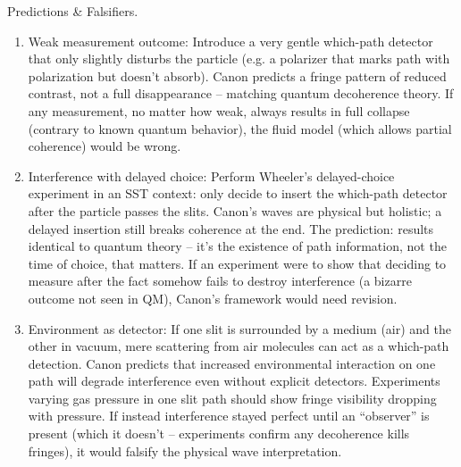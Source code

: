\documentclass[11pt]{article}
\begin{document}
Predictions & Falsifiers.


\begin{enumerate}

\item 
Weak measurement outcome: Introduce a very gentle which-path detector that only slightly disturbs the particle (e.g. a polarizer that marks path with polarization but doesn’t absorb). Canon predicts a fringe pattern of reduced contrast, not a full disappearance – matching quantum decoherence theory. If any measurement, no matter how weak, always results in full collapse (contrary to known quantum behavior), the fluid model (which allows partial coherence) would be wrong.




\item 
Interference with delayed choice: Perform Wheeler’s delayed-choice experiment in an SST context: only decide to insert the which-path detector after the particle passes the slits. Canon’s waves are physical but holistic; a delayed insertion still breaks coherence at the end. The prediction: results identical to quantum theory – it’s the existence of path information, not the time of choice, that matters. If an experiment were to show that deciding to measure after the fact somehow fails to destroy interference (a bizarre outcome not seen in QM), Canon’s framework would need revision.




\item 
Environment as detector: If one slit is surrounded by a medium (air) and the other in vacuum, mere scattering from air molecules can act as a which-path detection. Canon predicts that increased environmental interaction on one path will degrade interference even without explicit detectors. Experiments varying gas pressure in one slit path should show fringe visibility dropping with pressure. If instead interference stayed perfect until an “observer” is present (which it doesn’t – experiments confirm any decoherence kills fringes), it would falsify the physical wave interpretation.




\end{enumerate}
\end{document}
